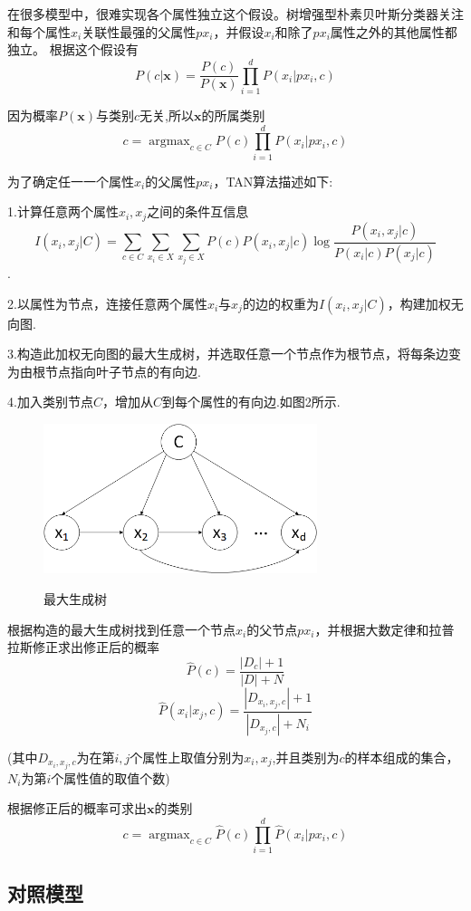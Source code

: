 \documentclass{ctexart}
\begin{document}
在很多模型中，很难实现各个属性独立这个假设。树增强型朴素贝叶斯分类器关注和每个属性$x_{i}$关联性最强的父属性$px_{i}$，并假设$x_{i}$和除了$px_{i}$属性之外的其他属性都独立。
根据这个假设有
$$P(c|\bm{x})=\frac{P(c)}{P(\bm{x})}\prod_{i=1}^{d}P(x_{i}|px_{i},c)$$

因为概率$P(\bm{x})$与类别$c$无关,所以$\bm{x}$的所属类别
$$c=\mathop{\arg\max}_{c\in C}P(c)\prod_{i=1}^{d}P(x_{i}|px_{i},c)$$

为了确定任一一个属性$x_{i}$的父属性$px_{i}$，TAN算法描述如下:

1.计算任意两个属性$x_{i},x_{j}$之间的条件互信息
$$I(x_{i},x_{j}|C)=\sum_{c\in C}\sum_{x_{i}\in X}\sum_{x_{j}\in X}P(c)P(x_{i},x_{j}|c)\log \frac{P(x_{i},x_{j}|c)}{P(x_{i}|c)P(x_{j}|c)}$$.

2.以属性为节点，连接任意两个属性$x_{i}$与$x_{j}$的边的权重为$I(x_{i},x_{j}|C)$，构建加权无向图.

3.构造此加权无向图的最大生成树，并选取任意一个节点作为根节点，将每条边变为由根节点指向叶子节点的有向边.

4.加入类别节点$C$，增加从$C$到每个属性的有向边.如图2所示.
\begin{figure}[!h]
  \centering
  \includegraphics[width=8cm]{TAN.png}\\
  \caption{{\fangsong 最大生成树}}
\end{figure}

根据构造的最大生成树找到任意一个节点$x_{i}$的父节点$px_{i}$，并根据大数定律和拉普拉斯修正求出修正后的概率
$$\hat{P}(c)=\frac{|D_{c}|+1}{|D|+N}$$
$$\hat{P}(x_{i}|x_{j},c)=\frac{|D_{x_{i},x_{j},c}|+1}{|D_{x_{j},c}|+N_{i}}$$

(其中$D_{x_{i},x_{j},c}$为在第$i,j$个属性上取值分别为$x_{i},x_{j}$,并且类别为$c$的样本组成的集合，$N_{i}$为第$i$个属性值的取值个数)

根据修正后的概率可求出$\bm{x}$的类别
$$c=\mathop{\arg\max}_{c\in C}\hat{P}(c)\prod_{i=1}^{d}\hat{P}(x_{i}|px_{i},c)$$


\subsection{对照模型}
\end{document}
